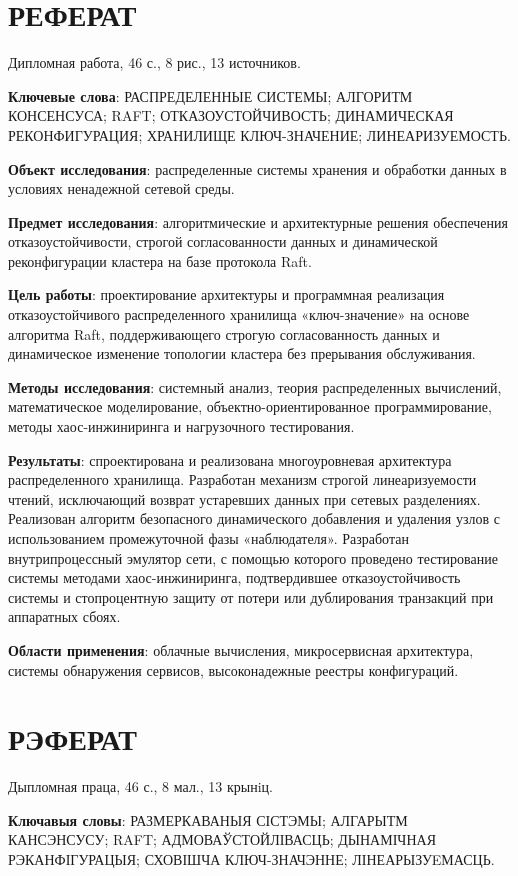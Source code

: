 \setcounter{page}{2}

\chapter*{РЕФЕРАТ}
Дипломная работа, 46 с., 8 рис., 13 источников.

\textbf{Ключевые слова}: РАСПРЕДЕЛЕННЫЕ СИСТЕМЫ; АЛГОРИТМ КОНСЕНСУСА; RAFT; ОТКАЗОУСТОЙЧИВОСТЬ; ДИНАМИЧЕСКАЯ РЕКОНФИГУРАЦИЯ; ХРАНИЛИЩЕ КЛЮЧ-ЗНАЧЕНИЕ; ЛИНЕАРИЗУЕМОСТЬ.

\textbf{Объект исследования}: распределенные системы хранения и обработки данных в условиях ненадежной сетевой среды.

\textbf{Предмет исследования}: алгоритмические и архитектурные решения обеспечения отказоустойчивости, строгой согласованности данных и динамической реконфигурации кластера на базе протокола Raft.

\textbf{Цель работы}: проектирование архитектуры и программная реализация отказоустойчивого распределенного хранилища «ключ-значение» на основе алгоритма Raft, поддерживающего строгую согласованность данных и динамическое изменение топологии кластера без прерывания обслуживания.

\textbf{Методы исследования}: системный анализ, теория распределенных вычислений, математическое моделирование, объектно-ориентированное программирование, методы хаос-инжиниринга и нагрузочного тестирования.

\textbf{Результаты}: спроектирована и реализована многоуровневая архитектура распределенного хранилища. Разработан механизм строгой линеаризуемости чтений, исключающий возврат устаревших данных при сетевых разделениях. Реализован алгоритм безопасного динамического добавления и удаления узлов с использованием промежуточной фазы «наблюдателя». Разработан внутрипроцессный эмулятор сети, с помощью которого проведено тестирование системы методами хаос-инжиниринга, подтвердившее отказоустойчивость системы и стопроцентную защиту от потери или дублирования транзакций при аппаратных сбоях.

\textbf{Области применения}: облачные вычисления, микросервисная архитектура, системы обнаружения сервисов, высоконадежные реестры конфигураций.

\chapter*{РЭФЕРАТ}
Дыпломная праца, 46 с., 8 мал., 13 крынiц.

\textbf{Ключавыя словы}: РАЗМЕРКАВАНЫЯ СІСТЭМЫ; АЛГАРЫТМ КАНСЭНСУСУ; RAFT; АДМОВАЎСТОЙЛІВАСЦЬ; ДЫНАМІЧНАЯ РЭКАНФІГУРАЦЫЯ; СХОВІШЧА КЛЮЧ-ЗНАЧЭННЕ; ЛІНЕАРЫЗУ\-EМАСЦЬ.

